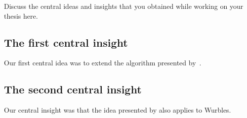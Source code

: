 Discuss the central ideas and insights that you obtained while working on your thesis here.

\subsection{The first central insight}
\label{sec:main-idea-one}

Our first central idea was to extend the algorithm presented by~\cite{Cockx2020}.

\subsection{The second central insight}
\label{sec:main-idea-two}

Our central insight was that the idea presented by \cite{Cook1990object,Cook2009understanding} also applies to Wurbles.
